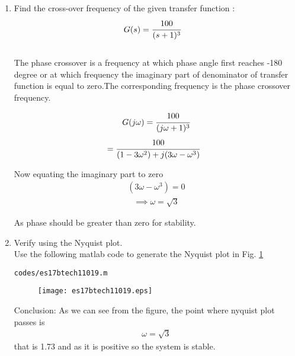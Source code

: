\begin{enumerate}[label=\thesection.\arabic*.,ref=\thesection.\theenumi]

\item  Find the cross-over frequency of the  given transfer function :
\begin{align}
\label{eq:es17btech11019_system}
G(s) &= \cfrac{100}{(s+1)^3}
\end{align}
\\
\solution The phase crossover is a frequency at which phase angle first reaches -180 degree or at which frequency the imaginary part of denominator of transfer function is equal to zero.The corresponding frequency is the phase crossover frequency.


\begin{align}
G(j\omega)=\cfrac{100}{(j\omega+1)^3}
\end{align}
\begin{align}
 &= \cfrac{100}{(1-3\omega^2)+j(3\omega-\omega^3)}
\end{align}
     
Now equating the imaginary part to zero
\begin{align}
(3\omega-\omega^3)=0
\end{align}  
\begin{align}
\implies \omega = \sqrt{3}
\end{align}

As phase should be greater than zero for stability.

\item Verify using the Nyquist plot.
\\
\solution Use the following matlab code to generate the Nyquist plot in Fig.  \ref{fig:es17btech11019}
\begin{lstlisting}
codes/es17btech11019.m
\end{lstlisting}
%
\begin{figure}[!h]
  \texttt{[image: es17btech11019.eps]}
  \caption{}
  \label{fig:es17btech11019}
\end{figure}


Conclusion: As we can see from the figure, the point where nyquist plot passes is
\begin{align}
{\omega=\sqrt{3}}
\end{align}
that is 1.73 and as it is positive so the system is stable.


\end{enumerate}